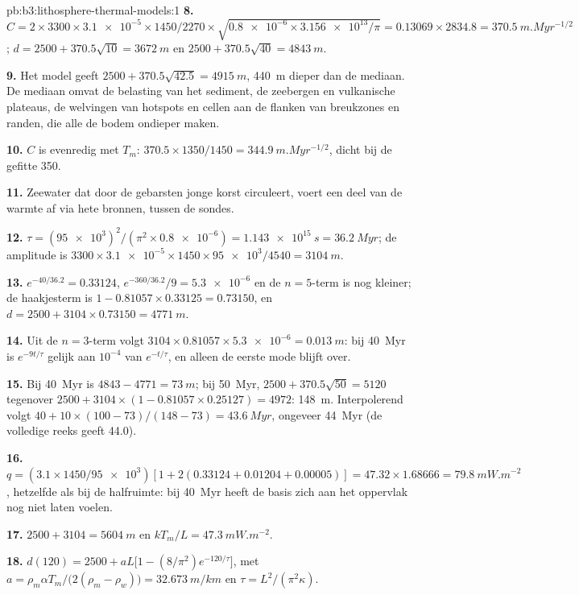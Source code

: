 \begin{solution}{pb:b3:lithosphere-thermal-models:1}
\textbf{8.} $C = 2\times3300\times\num{3.1e-5}\times1450/2270\times
\sqrt{\num{0.8e-6}\times\num{3.156e13}/\pi} = 0.13069\times2834.8 =
\qty{370.5}{m.Myr^{-1/2}}$; $d = 2500 + 370.5\sqrt{10} = \qty{3672}{m}$ en
$2500 + 370.5\sqrt{40} = \qty{4843}{m}$.

\textbf{9.} Het model geeft $2500 + 370.5\sqrt{42.5} = \qty{4915}{m}$,
\qty{440}{m} dieper dan de mediaan. De mediaan omvat de belasting van het
sediment, de zeebergen en vulkanische plateaus, de welvingen van hotspots en
cellen aan de flanken van breukzones en randen, die alle de bodem
ondieper maken.

\textbf{10.} $C$ is evenredig met $T_m$: $370.5\times1350/1450 =
\qty{344.9}{m.Myr^{-1/2}}$, dicht bij de gefitte 350.

\textbf{11.} Zeewater dat door de gebarsten jonge korst circuleert, voert
een deel van de warmte af via hete bronnen, tussen de sondes.

\textbf{12.} $\tau = (\num{95e3})^2/(\pi^2\times\num{0.8e-6}) =
\qty{1.143e15}{s} = \qty{36.2}{Myr}$; de amplitude is $3300\times
\num{3.1e-5}\times1450\times\num{95e3}/4540 = \qty{3104}{m}$.

\textbf{13.} $e^{-40/36.2} = 0.33124$, $e^{-360/36.2}/9 = \num{5.3e-6}$ en de
$n = 5$-term is nog kleiner; de haakjesterm is $1 - 0.81057\times0.33125 =
0.73150$, en $d = 2500 + 3104\times0.73150 = \qty{4771}{m}$.

\textbf{14.} Uit de $n = 3$-term volgt $3104\times0.81057\times\num{5.3e-6} =
\qty{0.013}{m}$: bij \qty{40}{Myr} is $e^{-9t/\tau}$ gelijk aan $10^{-4}$ van
$e^{-t/\tau}$, en alleen de eerste mode blijft over.

\textbf{15.} Bij \qty{40}{Myr} is $4843 - 4771 = \qty{73}{m}$; bij
\qty{50}{Myr}, $2500 + 370.5\sqrt{50} = 5120$ tegenover $2500 + 3104\times(1 -
0.81057\times0.25127) = 4972$: \qty{148}{m}. Interpolerend volgt $40 + 10\times
(100 - 73)/(148 - 73) = \qty{43.6}{Myr}$, ongeveer \qty{44}{Myr} (de volledige
reeks geeft 44.0).

\textbf{16.} $q = (3.1\times1450/\num{95e3})[1 + 2(0.33124 + 0.01204 +
0.00005)] = 47.32\times1.68666 = \qty{79.8}{mW.m^{-2}}$, hetzelfde als bij de
halfruimte: bij \qty{40}{Myr} heeft de basis zich aan het oppervlak nog niet
laten voelen.

\textbf{17.} $2500 + 3104 = \qty{5604}{m}$ en $kT_m/L = \qty{47.3}{mW.m^{-2}}$.

\textbf{18.} $d(120) = 2500 + aL\bigl[1 - (8/\pi^2)e^{-120/\tau}\bigr]$, met
$a = \rho_m\alpha T_m/\bigl(2(\rho_m - \rho_w)\bigr) = \qty{32.673}{m/km}$ en
$\tau = L^2/(\pi^2\kappa)$.


\end{solution}
